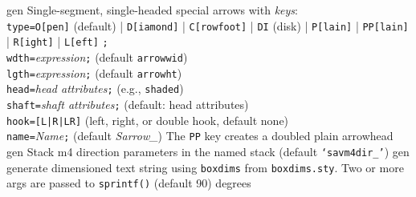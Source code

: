 %
  {gen}%
  {Single-segment, single-headed special arrows with {\sl keys}:\\
       {\tt type=}{\tt O[pen]} (default)
          | {\tt D[iamond]}
          | {\tt C[rowfoot]}
          | {\tt DI} (disk)
          | {\tt P[lain]}
          | {\tt PP[lain]}
          | {\tt R[ight]}
          | {\tt L[eft]} {\tt ;}\\
       {\tt wdth=}{\sl expression}{\tt ;} (default {\tt arrowwid})\\
       {\tt lgth=}{\sl expression}{\tt ;} (default {\tt arrowht})\\
       {\tt head=}{\sl head attributes}{\tt ;} (e.g., {\tt shaded})\\
       {\tt shaft=}{\sl shaft attributes}{\tt ;} (default: head attributes)\\
       {\tt hook=[L|R|LR]} (left, right, or double hook, default none)\\
       {\tt name=}{\sl Name}{\tt ;} (default {\sl Sarrow\_})
  The {\tt PP} key creates a doubled plain arrowhead
  }%
%
  {gen}%
  {Stack m4 direction parameters in the named stack
    (default {\tt `savm4dir\_'})}%
%
  {gen}%
  {generate dimensioned text string using {\tt{}boxdims} from
    {\tt boxdims.sty}. Two or more args are passed to {\tt sprintf()}
   (default 90) degrees }%

